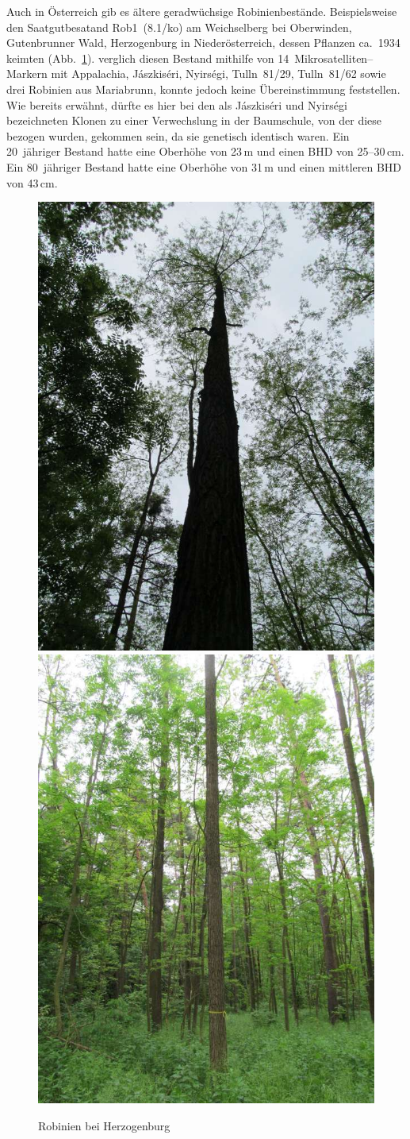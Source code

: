 \documentclass[twocolumn]{scrartcl}
\begin{document}
Auch in Österreich gib es ältere geradwüchsige Robinienbestände.
Beispielsweise den Saatgutbesatand Rob1~(8.1/ko) am Weichselberg bei
Oberwinden, Gutenbrunner Wald, Herzogenburg in Niederösterreich,
dessen Pflanzen ca.\ 1934 keimten (Abb.~\ref{fig:hezogenburg}).
\citet{heinze2014robinie} verglich diesen Bestand mithilfe von 14~Mikrosatelliten--Markern mit Appalachia, Jászkiséri, Nyirségi, Tulln~81/29, Tulln~81/62 sowie drei Robinien aus Mariabrunn, konnte jedoch keine Übereinstimmung feststellen.
Wie bereits erwähnt, dürfte es hier bei den als Jászkiséri und Nyirségi bezeichneten Klonen zu einer Verwechslung in der Baumschule, von der diese bezogen wurden, gekommen sein, da sie genetisch identisch waren.
Ein 20~jähriger Bestand hatte eine Oberhöhe von
23\,m und einen BHD von 25--30\,cm. Ein 80~jähriger Bestand hatte eine
Oberhöhe von 31\,m und einen mittleren BHD von 43\,cm.

\begin{figure}[htbp]
  \centering
  \includegraphics[width=.45\linewidth]{./bild/HerzogenburgRobinie2023a}
  \includegraphics[width=.45\linewidth]{./bild/HerzogenburgRobinie2023b}
  \caption{Robinien bei Herzogenburg}
  \label{fig:hezogenburg}
\end{figure}
\end{document}
